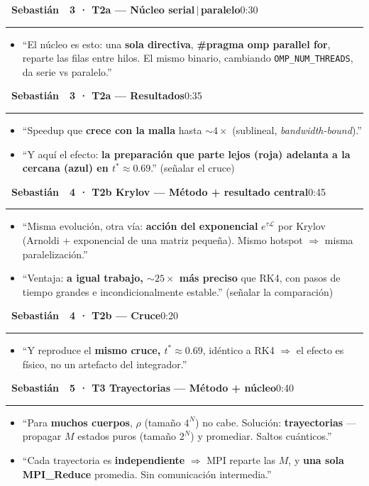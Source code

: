 \documentclass[11pt,a4paper]{article}
\newcommand{\Sb}{\colorbox{seb}{\color{white}\bfseries\footnotesize~Sebastián~}}
\newcommand{\cs}[1]{\textcolor{seb}{\textbf{#1}}}
\newcommand{\blk}[3]{%
  \par\medskip\noindent #1\ \textbf{#2}\hfill\textcolor{soft}{\small #3}\par
  \vspace{-4pt}\textcolor{soft!40}{\rule{\linewidth}{0.4pt}}\par\vspace{-2pt}}
\begin{document}
\blk{\Sb}{3 · T2a --- Núcleo serial\,$\vert$\,paralelo}{0:30}
\begin{itemize}
  \item ``El núcleo es esto: una \textbf{sola directiva}, \cs{\#pragma omp parallel for},
    reparte las filas entre hilos. El mismo binario, cambiando
    \texttt{OMP\_NUM\_THREADS}, da serie vs paralelo.''
\end{itemize}

\blk{\Sb}{3 · T2a --- Resultados}{0:35}
\begin{itemize}
  \item ``Speedup que \textbf{crece con la malla} hasta $\sim4\times$ (sublineal,
    \emph{bandwidth-bound}).''
  \item ``Y aquí el efecto: \textbf{la preparación que parte lejos (roja) adelanta a
    la cercana (azul) en $t^*\approx0.69$}.'' (señalar el cruce)
\end{itemize}

\blk{\Sb}{4 · T2b Krylov --- Método + resultado central}{0:45}
\begin{itemize}
  \item ``Misma evolución, otra vía: \textbf{acción del exponencial} $e^{\tau\mathcal{L}}$
    por Krylov (Arnoldi + exponencial de una matriz pequeña). Mismo hotspot $\Rightarrow$
    misma paralelización.''
  \item ``Ventaja: \textbf{a igual trabajo, $\sim25\times$ más preciso} que RK4, con
    pasos de tiempo grandes e incondicionalmente estable.'' (señalar la comparación)
\end{itemize}

\blk{\Sb}{4 · T2b --- Cruce}{0:20}
\begin{itemize}
  \item ``Y reproduce el \textbf{mismo cruce, $t^*\approx0.69$}, idéntico a RK4
    $\Rightarrow$ el efecto es físico, no un artefacto del integrador.''
\end{itemize}

\blk{\Sb}{5 · T3 Trayectorias --- Método + núcleo}{0:40}
\begin{itemize}
  \item ``Para \textbf{muchos cuerpos}, $\rho$ (tamaño $4^N$) no cabe. Solución:
    \textbf{trayectorias} --- propagar $M$ estados puros (tamaño $2^N$) y promediar.
    Saltos cuánticos.''
  \item ``Cada trayectoria es \textbf{independiente} $\Rightarrow$ MPI reparte las $M$,
    y \textbf{una sola \cs{MPI\_Reduce}} promedia. Sin comunicación intermedia.''
\end{itemize}
\end{document}
